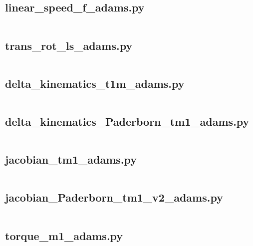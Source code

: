         \subsection{linear\_speed\_f\_adams.py}
        {\footnotesize 
            \inputminted{python}{Back/codigos_py/linear_speed_f_adams.py}
            }
        \newpage
        
        \subsection{trans\_rot\_ls\_adams.py}
        {\footnotesize 
            \inputminted{python}{Back/codigos_py/trans_rot_ls_adams.py}
            }
        \newpage
        
        \subsection{delta\_kinematics\_t1m\_adams.py}
        {\footnotesize 
            \inputminted{python}{Back/codigos_py/delta_kinematics_t1m_adams.py}
            }
        \newpage
        
        \subsection{delta\_kinematics\_Paderborn\_tm1\_adams.py}
        {\footnotesize 
            \inputminted{python}{Back/codigos_py/delta_kinematics_Paderborn_tm1_adams.py}
            }
        \newpage
        

        \subsection{jacobian\_tm1\_adams.py}
        {\footnotesize 
            \inputminted{python}{Back/codigos_py/jacobian_tm1_adams.py}
            }
        \newpage
    
        \subsection{jacobian\_Paderborn\_tm1\_v2\_adams.py}
        {\footnotesize 
            \inputminted{python}{Back/codigos_py/jacobian_Paderborn_tm1_v2_adams.py}
            }
        \newpage    
    
        \subsection{torque\_m1\_adams.py}
        {\footnotesize 
            \inputminted{python}{Back/codigos_py/torque_m1_adams.py}
            }
        \newpage    
        

